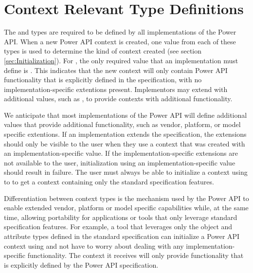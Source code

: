 
\section{Context Relevant Type Definitions}\label{sec:ContextTypeDefinitions}

The  and  types are required to be defined by all implementations of the Power API.
When a new Power API context is created, one value from each of these types is used to determine the kind of context created (see section \ref{sec:Initialization}).
For , the only required value that an implementation must define is \CNTXTDEFAULTrefx.
This indicates that the new context will only contain Power API functionality that is explicitly defined in the specification, with no implementation-specific extentions present.
Implementors may extend  with additional values, such as \CNTXTVENDORrefx, to provide contexts with additional functionality.

We anticipate that most implementations of the Power API will define additional  values that provide additional functionality, such as vendor, platform, or model specific extentions.
If an implementation extends the specification, the extensions should only be visible to the user when they use a context that was created with an implementation-specific  value.
If the implementation-specific extensions are not available to the user, initialization using an implementation-specific  value should result in failure.
The user must always be able to initialize a context using \CNTXTDEFAULTref to to get a context containing only the standard specification features.

Differentiation between context types is the mechanism used by the Power API to enable extended vendor, platform or model specific capabilities while, at the same time, allowing portability for applications or tools that only leverage standard specification features. 
For example, a tool that leverages only the object and attribute types defined in the standard specification can initialize a Power API context using \CNTXTDEFAULTrefx and not have to worry about dealing with any implementation-specific functionality.
The context it receives will only provide functionality that is explicitly defined by the Power API specification.

